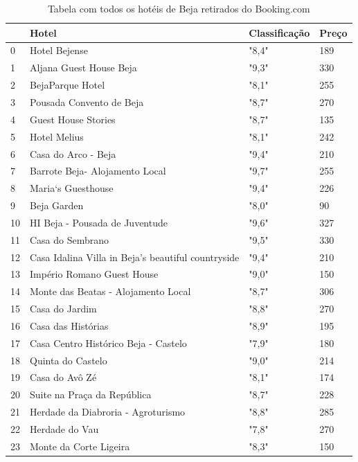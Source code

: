 \documentclass[a4paper,10pt]{article}
\begin{document}
\begin{table}[!ht]
  \centering
  \begin{tabular}{|l|l|l|l|}
  \hline
      ~ & Hotel & Classificação & Preço \\ \hline
      0 & Hotel Bejense & "8,4" & 189 \\ \hline
      1 & Aljana Guest House Beja & "9,3" & 330 \\ \hline
      2 & BejaParque Hotel & "8,1" & 255 \\ \hline
      3 & Pousada Convento de Beja & "8,7" & 270 \\ \hline
      4 & Guest House Stories & "8,7" & 135 \\ \hline
      5 & Hotel Melius & "8,1" & 242 \\ \hline
      6 & Casa do Arco - Beja & "9,4" & 210 \\ \hline
      7 & Barrote Beja- Alojamento Local & "9,7" & 255 \\ \hline
      8 & Maria`s Guesthouse & "9,4" & 226 \\ \hline
      9 & Beja Garden & "8,0" & 90 \\ \hline
      10 & HI Beja - Pousada de Juventude & "9,6" & 327 \\ \hline
      11 & Casa do Sembrano & "9,5" & 330 \\ \hline
      12 & Casa Idalina Villa in Beja's beautiful countryside & "9,4" & 210 \\ \hline
      13 & Império Romano Guest House & "9,0" & 150 \\ \hline
      14 & Monte das Beatas - Alojamento Local & "8,7" & 306 \\ \hline
      15 & Casa do Jardim & "8,8" & 270 \\ \hline
      16 & Casa das Histórias & "8,9" & 195 \\ \hline
      17 & Casa Centro Histórico Beja - Castelo & "7,9" & 180 \\ \hline
      18 & Quinta do Castelo & "9,0" & 214 \\ \hline
      19 & Casa do Avô Zé & "8,1" & 174 \\ \hline
      20 & Suite na Praça da República & "8,7" & 228 \\ \hline
      21 & Herdade da Diabroria - Agroturismo & "8,8" & 285 \\ \hline
      22 & Herdade do Vau & "7,8" & 270 \\ \hline
      23 & Monte da Corte Ligeira & "8,3" & 150 \\ \hline
  \end{tabular}
        \caption{Tabela com todos os hotéis de Beja retirados do Booking.com}
\end{table}
\end{document}

